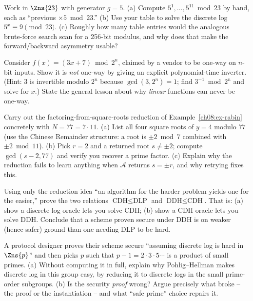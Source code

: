 \begin{exercise}
\label{ch08:ex-4}
Work in $\Zns{23}$ with generator $g=5$. (a) Compute $5^{1},\dots,5^{11} \bmod 23$ by hand, each as ``previous $\times 5 \bmod 23$.'' (b) Use your table to solve the discrete log $5^{x}\equiv 9 \pmod{23}$. (c) Roughly how many table entries would the analogous brute-force search scan for a 256-bit modulus, and why does that make the forward/backward asymmetry usable?
\end{exercise}

\begin{exercise}
\label{ch08:ex-5}
Consider $f(x) = (3x + 7) \bmod 2^{n}$, claimed by a vendor to be one-way on $n$-bit inputs. Show it is \emph{not} one-way by giving an explicit polynomial-time inverter. (Hint: $3$ is invertible modulo $2^{n}$ because $\gcd(3,2^{n})=1$; find $3^{-1} \bmod 2^{n}$ and solve for $x$.) State the general lesson about why \emph{linear} functions can never be one-way.
\end{exercise}

\begin{exercise}
\label{ch08:ex-6}
Carry out the factoring-from-square-roots reduction of Example~\ref{ch08:ex-rabin} concretely with $N = 77 = 7 \cdot 11$. (a) List all four square roots of $y = 4$ modulo $77$ (use the Chinese Remainder structure: a root is $\pm 2 \bmod 7$ combined with $\pm 2 \bmod 11$). (b) Pick $r = 2$ and a returned root $s \ne \pm 2$; compute $\gcd(s - 2, 77)$ and verify you recover a prime factor. (c) Explain why the reduction fails to learn anything when $\mathcal A$ returns $s = \pm r$, and why retrying fixes this.
\end{exercise}

\begin{exercise}
\label{ch08:ex-7}
Using only the reduction idea ``an algorithm for the harder problem yields one for the easier,'' prove the two relations $\text{CDH} \le \text{DLP}$ and $\text{DDH} \le \text{CDH}$. That is: (a) show a discrete-log oracle lets you solve CDH; (b) show a CDH oracle lets you solve DDH. Conclude that a scheme proven secure under DDH is on weaker (hence safer) ground than one needing DLP to be hard.
\end{exercise}

\begin{exercise}
\label{ch08:ex-8}
A protocol designer proves their scheme secure ``assuming discrete log is hard in $\Zns{p}$'' and then picks $p$ such that $p - 1 = 2 \cdot 3 \cdot 5 \cdots$ is a product of small primes. (a) Without computing it in full, explain why Pohlig--Hellman makes discrete log in this group easy, by reducing it to discrete logs in the small prime-order subgroups. (b) Is the security \emph{proof} wrong? Argue precisely what broke -- the proof or the instantiation -- and what ``safe prime'' choice repairs it.
\end{exercise}

